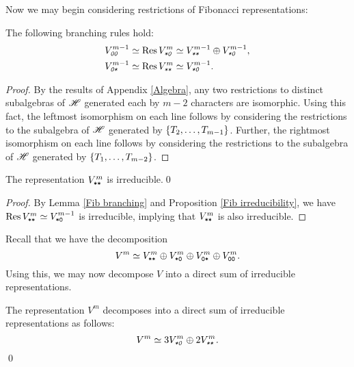 \documentclass{amsart}
\begin{document}
Now we may begin considering restrictions of Fibonacci representations:
\begin{lemma}\label{Fib branching}
  The following branching rules hold:
  \begin{align*}
    \emph{$V^{m-1}_{\texttt{0}\texttt{0}}$} \simeq \emph{$\operatorname{Res} V_{\texttt{*}\texttt{0}}^m$} &\simeq \emph{$V^{m-1}_{\texttt{*}\texttt{*}} \oplus V^{m-1}_{\texttt{*}\texttt{0}}$},\\
    \emph{$V_{\texttt{0}\texttt{*}}^{m-1} \simeq \operatorname{Res} V_{\texttt{*}\texttt{*}}^m$} &\simeq \emph{$V_{\texttt{*}\texttt{0}}^{m-1}$}.
  \end{align*}
\end{lemma}
\begin{proof}
  By the results of Appendix \ref{Algebra}, any two restrictions to distinct subalgebras of $\mathscr{H}$ generated each by $m-2$ characters are isomorphic.
  Using this fact, the leftmost isomorphism on each line follows by considering the restrictions to the subalgebra of $\mathscr{H}$ generated by $\left\{ T_2,\dots,T_{m-1} \right\}$.
  Further, the rightmost isomorphism on each line follows by considering the restrictions to the subalgebra of $\mathscr{H}$ generated by $\left\{ T_1,\dots,T_{m-2} \right\}$.
\end{proof}
\begin{corollary}
  The representation \emph{$V^m_{\texttt{*}\texttt{*}}$} is irreducible.\qed
\end{corollary}
\begin{proof}
  By Lemma \ref{Fib branching} and Proposition \ref{Fib irreducibility}, we have $\operatorname{Res} V^m_{\texttt{*}\texttt{*}} \simeq V^{m-1}_{\texttt{*}\texttt{0}}$ is irreducible, implying that $V^m_{\texttt{*}\texttt{*}}$ is also irreducible.
\end{proof}
Recall that we have the decomposition
\[
  V^m \simeq V^m_{\texttt{*}\texttt{*}} \oplus V^m_{\texttt{*}\texttt{0}} \oplus V^m_{\texttt{0}\texttt{*}} \oplus V^m_{\texttt{0}\texttt{0}}.
\]
Using this, we may now decompose $V$ into a direct sum of irreducible representations.
\begin{corollary}\label{V decomposition into V}
  The representation $V^m$ decomposes into a direct sum of irreducible representations as follows:
  \[
    \emph{$V^m \simeq 3V^m_{\texttt{*}\texttt{0}} \oplus 2V^m_{\texttt{*}\texttt{*}}$.}
  \]\qed
\end{corollary}
\end{document}
